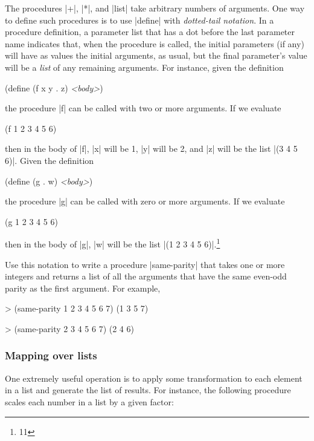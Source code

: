 \begin{Exercise}
\label{exc:2.20}
The procedures \scheme|+|, \scheme|*|, and \scheme|list| take
arbitrary numbers of arguments. One way to define such procedures is
to use \scheme|define| with \textit{dotted-tail notation}.  In a
procedure definition, a parameter list that has a dot before the last
parameter name indicates that, when the procedure is called, the
initial parameters (if any) will have as values the initial arguments,
as usual, but the final parameter's value will be a \textit{list} of
any remaining arguments.  For instance, given the definition

\begin{schemedisplay}
(define (f x y . z) \textit{<body>})
\end{schemedisplay}
the procedure \scheme|f| can be called with two or more arguments.
If we evaluate

\begin{schemedisplay}
(f 1 2 3 4 5 6)
\end{schemedisplay}
then in the body of \scheme|f|, \scheme|x| will be 1, \scheme|y| will be
2, and \scheme|z| will be the list \scheme|(3 4 5 6)|.
Given the definition

\begin{schemedisplay}
(define (g . w) \textit{<body>})
\end{schemedisplay}
the procedure \scheme|g| can be called with zero or more arguments.
If we evaluate

\begin{schemedisplay}
(g 1 2 3 4 5 6)
\end{schemedisplay}
then in the body of \scheme|g|, \scheme|w| will be the
list \scheme|(1 2 3 4 5 6)|.\footnote{11}

Use this notation
to write a procedure \scheme|same-parity| that takes one or more integers
and returns a list of all the arguments that have the same even-odd
parity as the first argument.  For example,
\begin{schemedisplay}
> (same-parity 1 2 3 4 5 6 7)
(1 3 5 7)

> (same-parity 2 3 4 5 6 7)
(2 4 6)
\end{schemedisplay}
\end{Exercise}

\subsubsection*{Mapping over lists}


One extremely useful operation is to apply some transformation
to each element in a list and generate the list of results.
For instance, the following procedure scales each number in a list by
a given factor:

